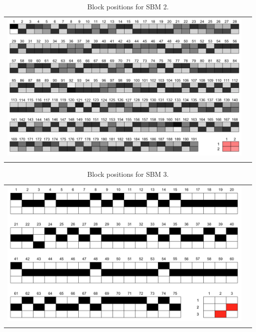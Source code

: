 \documentclass[fleqn,12pt]{wlscirep}
\begin{document}
\begin{longtable}[!h]{c@{\hskip 0cm}c}
\includegraphics[height=.4\textheight, clip=true, trim=0cm 0cm 0cm 0cm]{figures/SBM_m2}   \\
\caption{\label{fig:SBM_plot_2} Block positions for SBM 2.}
\end{longtable}

\begin{longtable}[!h]{c@{\hskip 0cm}c}
\includegraphics[height=.4\textheight, clip=true, trim=0cm 0cm 0cm 0cm]{figures/SBM_m3}   \\
\caption{\label{fig:SBM_plot_3} Block positions for SBM 3.}
\end{longtable}




\clearpage



\end{document}
